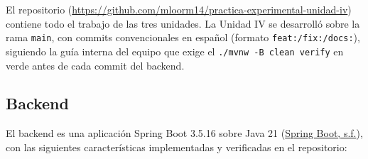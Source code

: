 \documentclass[12pt,a4paper]{article}
\begin{document}
El repositorio (\url{https://github.com/mloorm14/practica-experimental-unidad-iv})
contiene todo el trabajo de las tres unidades. La Unidad IV se desarrolló sobre la rama
\texttt{main}, con commits convencionales en español (formato
\texttt{feat:/fix:/docs:}), siguiendo la guía interna del equipo que exige el
\texttt{./mvnw -B clean verify} en verde antes de cada commit del backend.

\subsection{Backend}

El backend es una aplicación Spring Boot 3.5.16 sobre Java 21 (\hyperlink{ref:springboot}{Spring Boot, s.f.}), con las siguientes
características implementadas y verificadas en el repositorio:
\end{document}
